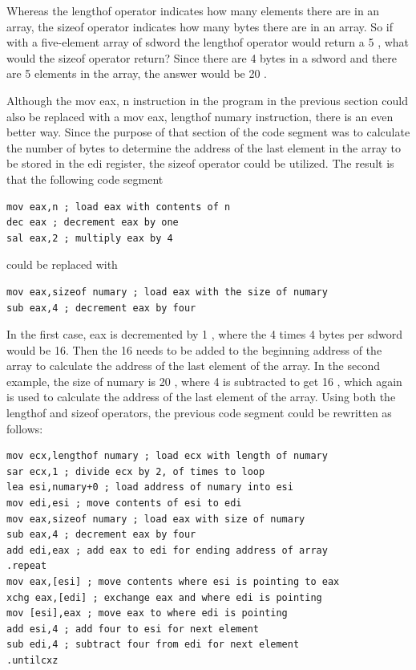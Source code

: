 \documentclass[10pt]{article}
\begin{document}
Whereas the lengthof operator indicates how many elements there are in an array, the sizeof operator indicates how many bytes there are in an array. So if with a five-element array of sdword the lengthof operator would return a 5 , what would the sizeof operator return? Since there are 4 bytes in a sdword and there are 5 elements in the array, the answer would be 20 .

Although the mov eax, n instruction in the program in the previous section could also be replaced with a mov eax, lengthof numary instruction, there is an even better way. Since the purpose of that section of the code segment was to calculate the number of bytes to determine the address of the last element in the array to be stored in the edi register, the sizeof operator could be utilized. The result is that the following code segment

\begin{verbatim}
mov eax,n ; load eax with contents of n
dec eax ; decrement eax by one
sal eax,2 ; multiply eax by 4
\end{verbatim}

could be replaced with

\begin{verbatim}
mov eax,sizeof numary ; load eax with the size of numary
sub eax,4 ; decrement eax by four
\end{verbatim}

In the first case, eax is decremented by 1 , where the 4 times 4 bytes per sdword would be 16. Then the 16 needs to be added to the beginning address of the array to calculate the address of the last element of the array. In the second example, the size of numary is 20 , where 4 is subtracted to get 16 , which again is used to calculate the address of the last element of the array. Using both the lengthof and sizeof operators, the previous code segment could be rewritten as follows:

\begin{verbatim}
mov ecx,lengthof numary ; load ecx with length of numary
sar ecx,1 ; divide ecx by 2, of times to loop
lea esi,numary+0 ; load address of numary into esi
mov edi,esi ; move contents of esi to edi
mov eax,sizeof numary ; load eax with size of numary
sub eax,4 ; decrement eax by four
add edi,eax ; add eax to edi for ending address of array
.repeat
mov eax,[esi] ; move contents where esi is pointing to eax
xchg eax,[edi] ; exchange eax and where edi is pointing
mov [esi],eax ; move eax to where edi is pointing
add esi,4 ; add four to esi for next element
sub edi,4 ; subtract four from edi for next element
.untilcxz
\end{verbatim}
\end{document}
